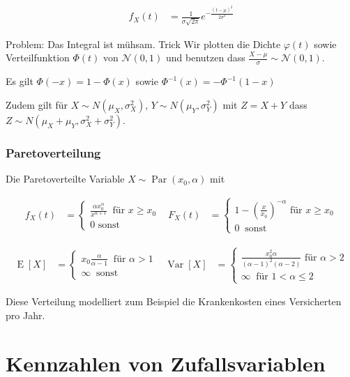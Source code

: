 \documentclass[25pt]{sciposter}
\newcommand{\Nor}{\mathcal{N}}
\newcommand{\Var}{\operatorname{Var}}
\newcommand{\E}{\operatorname{E}}
\begin{document}
\begin{multicols}{3}
\begin{align*}
f_X(t) &= \frac{1}{\sigma\sqrt{2\pi}}e^{-\frac{(t-\mu)^2}{2\sigma^2}}
\end{align*}

Problem: Das Integral ist mühsam. Trick Wir plotten die Dichte $\varphi(t)$ sowie Verteilfunktion $\Phi(t)$ von $\Nor(0,1)$ und benutzen dass $\frac{X-\mu}{\sigma} \sim \Nor(0,1)$.

Es gilt $\Phi(-x) = 1 - \Phi(x)$ sowie ${\Phi^{-1}(x) = -\Phi^{-1}(1-x)}$


Zudem gilt für $X\sim N(\mu_X,\sigma^2_X)$, $Y \sim N(\mu_Y, \sigma^2_Y)$ mit $Z=X+Y$ dass $Z \sim N(\mu_X+\mu_Y, \sigma^2_X + \sigma^2_Y)$.


\subsubsection*{Paretoverteilung}
Die Paretoverteilte Variable $X\sim\operatorname{Par}(x_0,\alpha)$ mit 

\begin{align*}
f_X(t) &= \begin{cases}
\frac{\alpha x_0 ^\alpha}{x^{\alpha+1}} \ \text{ für } x \geq x_0 \\
0 \text{ sonst}
\end{cases}
& 
F_X(t) &= \begin{cases}
1-\left(\frac{x}{x_0}\right)^{-\alpha} \text{ für } x \geq x_0\\
0 \ \text{ sonst}
\end{cases}
\end{align*}

\begin{align*}
\E[X] &= \begin{cases}
x_0 \frac{\alpha}{\alpha - 1}\ \text{ für } \alpha > 1 \\
\infty \ \text{ sonst}
\end{cases}
& 
\Var[X] &= \begin{cases}
\frac{x_0 ^2 \alpha}{(\alpha-1)^2(\alpha-2)} \text{ für } \alpha > 2\\
\infty \ \text{ für } 1 < \alpha \leq 2
\end{cases}
\end{align*}

Diese Verteilung modelliert zum Beispiel die Krankenkosten eines Versicherten pro Jahr.


\section{Kennzahlen von Zufallsvariablen}



\end{multicols}
\end{document}
